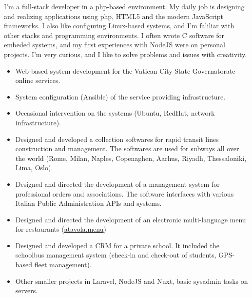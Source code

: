 \documentclass[10pt,a4paper]{altacv}
\begin{document}

\begin{fullwidth}
\makecvheader
\end{fullwidth}

I'm a full-stack developer in a php-based environment. My daily job is designing and realizing applications using php, HTML5 and the modern JavaScript frameworks. I also like configuring Linux-based systems, and I'm faliliar with other stacks and programming environments. I often wrote C software for embeded systems, and my first experiences with NodeJS were on personal projects. I'm very curious, and I like to solve problems and issues with creativity.


\begin{itemize}
\item Web-based system development for the Vatican City State Governatorate online services.
\item System configuration (Ansible) of the service providing infrastructure.
\item Occasional intervention on the systems (Ubuntu, RedHat, network infrastructure).
\end{itemize}

\divider

\begin{itemize}
\item Designed and developed a collection softwares for rapid transit lines construction and management. The softwares are used for subways all over the world (Rome, Milan, Naples, Copenaghen, Aarhus, Riyadh, Thessaloniki, Lima, Oslo).
\item Designed and directed the development of a management system for professional orders and associations. The software interfaces with various Italian Public Administration APIs and systems.
\item Designed and directed the development of an electronic multi-language menu for restaurants (\href{https://atavola.menu}{atavola.menu})
\item Designed and developed a CRM for a private school. It included the schoolbus management system (check-in and check-out of students, GPS-based fleet management).
\item Other smaller projects in Laravel, NodeJS and Nuxt, basic sysadmin tasks on servers.
\end{itemize}
\end{document}

